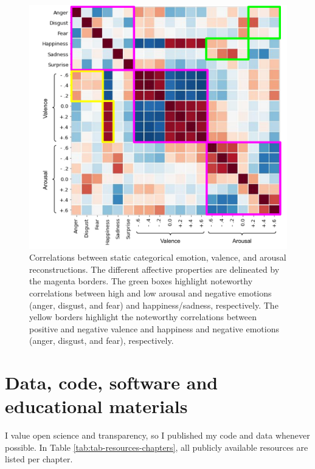 \documentclass[11pt,american,]{memoir} %
\begin{document}
\begin{figure}
\centering
\includegraphics{_bookdown_files/static-vs-dynamic-files/figures/figure_S9.pdf}
\caption{\label{fig:fig-svsd-S9}Correlations between static categorical emotion, valence, and arousal reconstructions. The different affective properties are delineated by the magenta borders. The green boxes highlight noteworthy correlations between high and low arousal and negative emotions (anger, disgust, and fear) and happiness/sadness, respectively. The yellow borders highlight the noteworthy correlations between positive and negative valence and happiness and negative emotions (anger, disgust, and fear), respectively.}
\end{figure}



\hypertarget{resources-supplement}{%
\chapter{Data, code, software and educational materials}\label{resources-supplement}}

I value open science and transparency, so I published my code and data whenever possible. In Table \ref{tab:tab-resources-chapters}, all publicly available resources are listed per chapter.

\begingroup\fontsize{8}{10}\selectfont
\end{document}
